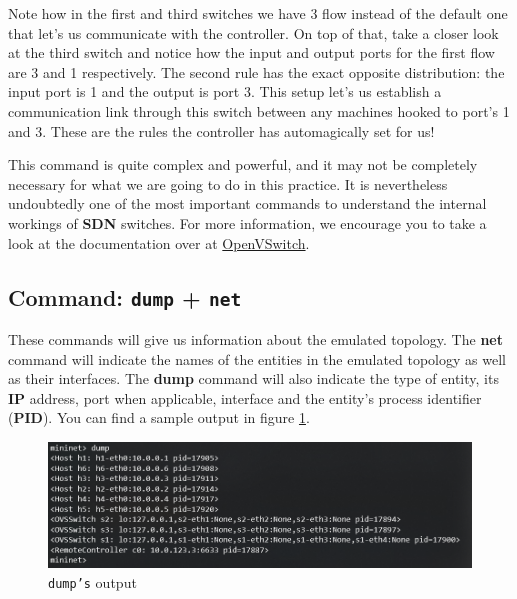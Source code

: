 \documentclass[12pt]{article}
\newcommand{\newpar} {
    \vskip 1cm
}
\begin{document}
		Note how in the first and third switches we have 3 flow instead of the default one that let's us communicate with the controller. On top of that, take a closer look at the third switch and notice how the input and output ports for the first flow are 3 and 1 respectively. The second rule has the exact opposite distribution: the input port is 1 and the output is port 3. This setup let's us establish a communication link through this switch between any machines hooked to port's 1 and 3. These are the rules the controller has automagically set for us!
		\newpar
		This command is quite complex and powerful, and it may not be completely necessary for what we are going to do in this practice. It is nevertheless undoubtedly one of the most important commands to understand the internal workings of \textbf{SDN} switches. For more information, we encourage you to take a look at the documentation over at \href{http://www.openvswitch.org/support/dist-docs/ovs-ofctl.8.txt}{OpenVSwitch}.

	\subsection{Command: \texttt{dump} + \texttt{net}}
		These commands will give us information about the emulated topology. The \textbf{net} command will indicate the names of the entities in the emulated topology as well as their interfaces. The \textbf{dump} command will also indicate the type of entity, its \textbf{IP} address, port when applicable, interface and the entity's process identifier (\textbf{PID}). You can find a sample output in figure \ref{f:dump}.

        \newpage
		\begin{figure}[!htb]
			\centering
			\includegraphics[width=\linewidth]{dump.png}
			\caption{\texttt{dump's} output}
			\label{f:dump}
		\end{figure}
\end{document}
